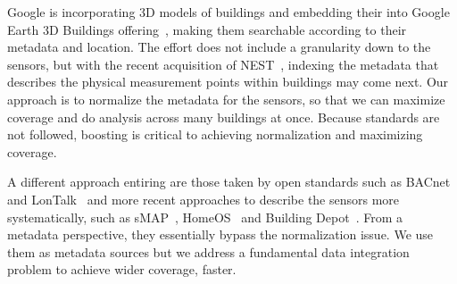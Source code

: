 Google is incorporating 3D models of buildings and embedding their into Google 
Earth 3D Buildings offering~\cite{google_3dbuildings}, making them searchable according 
to their metadata and location.
The effort does not include a granularity down to the sensors, but with the recent acquisition
of NEST~\cite{nest}, indexing the metadata that describes the physical measurement points
within buildings may come next.  Our approach is to normalize the metadata for the sensors,
so that we can maximize coverage and do analysis across many buildings at once.  Because standards
are not followed, boosting is critical to achieving normalization and maximizing coverage.

A different approach entiring are those taken by open standards such as BACnet and 
LonTalk~\cite{lontalk,bacnet} and more recent approaches to describe the sensors more
systematically, such as sMAP~\cite{smap}, HomeOS~\cite{homeos} and Building Depot~\cite{BDepot}.  From a metadata perspective, they
essentially bypass the normalization issue.  We use them as metadata sources but we address a
fundamental data integration problem to achieve wider coverage, faster.
